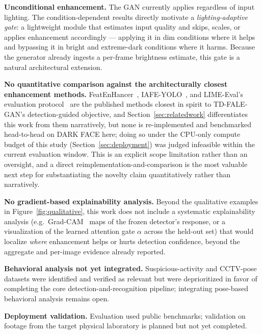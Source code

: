 \documentclass[conference]{IEEEtran}
\begin{document}
\textbf{Unconditional enhancement.} The GAN currently applies
regardless of input lighting. The condition-dependent results
directly motivate a \textit{lighting-adaptive gate}: a lightweight
module that estimates input quality and skips, scales, or applies
enhancement accordingly --- applying it in dim conditions where it
helps and bypassing it in bright and extreme-dark conditions where
it harms. Because the generator already ingests a per-frame
brightness estimate, this gate is a natural architectural
extension.

\textbf{No quantitative comparison against the architecturally
closest enhancement methods.} FeatEnHancer~\cite{featenhancer},
IAFE-YOLO~\cite{iafeyolo}, and LIME-Eval's evaluation
protocol~\cite{limeeval} are the published methods closest in
spirit to TD-FALE-GAN's detection-guided objective, and
Section~\ref{sec:relatedwork} differentiates this work from them
narratively, but none is re-implemented and benchmarked
head-to-head on DARK FACE here; doing so under the CPU-only
compute budget of this study (Section~\ref{sec:deployment}) was
judged infeasible within the current evaluation window. This is
an explicit scope limitation rather than an oversight, and a
direct reimplementation-and-comparison is the most valuable next
step for substantiating the novelty claim quantitatively rather
than narratively.

\textbf{No gradient-based explainability analysis.} Beyond the
qualitative examples in Figure~\ref{fig:qualitative}, this work
does not include a systematic explainability analysis (e.g.\
Grad-CAM~\cite{gradcam} maps of the frozen detector's response, or
a visualization of the learned attention gate $\alpha$ across the
held-out set) that would localize \textit{where} enhancement helps
or hurts detection confidence, beyond the aggregate and per-image
evidence already reported.

\textbf{Behavioral analysis not yet integrated.} Suspicious-activity
and CCTV-pose datasets were identified and verified as relevant but
were deprioritized in favor of completing the core
detection-and-recognition pipeline; integrating pose-based
behavioral analysis remains open.

\textbf{Deployment validation.}
\label{sec:deploymentvalidation}
Evaluation used public benchmarks;
validation on footage from the target physical laboratory is
planned but not yet completed.
\end{document}
